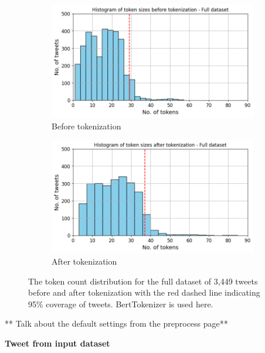 \begin{figure}[htbp]
    \centering
    \captionsetup{font=small}
    \begin{subfigure}[b]{0.48\textwidth}
        \includegraphics[width=\textwidth]{figures/token_hist.png}
        \caption{Before tokenization}
        \label{fig: token_hist}
    \end{subfigure}
    \hfill
    \begin{subfigure}[b]{0.48\textwidth}
        \includegraphics[width=\textwidth]{figures/token_pp_hist.png}
        \caption{After tokenization}
        \label{fig: token_pp_hist}
    \end{subfigure}
    \caption{The token count distribution for the full dataset of 3,449 tweets before and after tokenization with the red dashed line indicating 95\% coverage of tweets. BertTokenizer is used here.}
    \label{fig: bef_aft_token}
\end{figure}

** Talk about the default settings from the preprocess page**

\textbf{Tweet from input dataset}\newline

